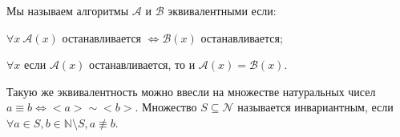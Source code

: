 Мы называем алгоритмы $\mathcal{A}$ и $\mathcal{B}$ эквивалентными если:
\begin{itemtask}
    \item $\forall x\  \mathcal{A}(x)$ останавливается $\Leftrightarrow \mathcal{B}(x)$ останавливается;
	\item $\forall x$ если $\mathcal{A}(x)$ останавливается, то и $\mathcal{A}(x) = \mathcal{B}(x)$.
\end{itemtask}

Такую же эквивалентность можно ввесли на множестве натуральных чисел $a \equiv b \Leftrightarrow {<}a{>} \sim
{<}b{>}$. Множество $S \subseteq \mathcal{N}$ называется инвариантным, если $\forall a \in S, b \in \mathbb{N} \setminus S, a
\not\equiv b$.
